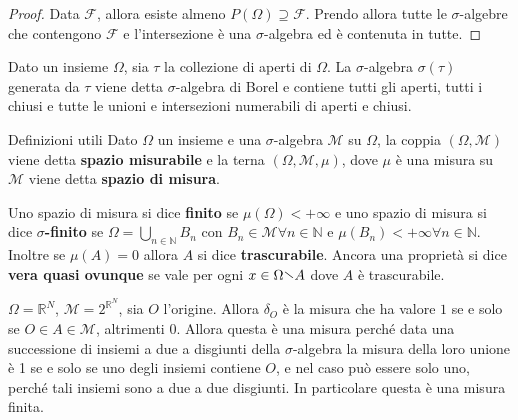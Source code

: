 \begin{proof}
    Data \(\mathcal{F}\), allora esiste almeno \(P(\Omega) \supseteq \mathcal{F}
    \). Prendo allora tutte le \(\sigma\)-algebre che contengono \(\mathcal{F}\)
    e l'intersezione è una \(\sigma\)-algebra ed è contenuta in tutte.
\end{proof}

\begin{example}
    Dato un insieme \(\Omega\), sia \(\tau\) la collezione di aperti di
    \(\Omega\). La \(\sigma\)-algebra \(\sigma(\tau)\) generata da \(\tau\)
    viene detta \(\sigma\)-algebra di Borel e contiene tutti gli aperti, tutti i
    chiusi e tutte le unioni e intersezioni numerabili di aperti e chiusi.
\end{example}

\begin{definition}[label=def:def_misura]{Definizioni utili}
    Dato \(\Omega\) un insieme e una \(\sigma\)-algebra \(\mathcal{M}\) su
    \(\Omega\), la coppia \((\Omega, \mathcal{M})\) viene detta \textbf{spazio
    misurabile} e la terna \((\Omega, \mathcal{M}, \mu)\), dove \(\mu\) è una
    misura su \(\mathcal{M}\) viene detta \textbf{spazio di misura}.

    Uno spazio di misura si dice \textbf{finito} se \(\mu(\Omega) < +\infty\) e
    uno spazio di misura si dice \textbf{\(\sigma\)-finito} se \(\Omega =
    \bigcup_{n \in \mathbb{N}} B_{n} \) con \(B_{n} \in \mathcal{M} \forall n
    \in \mathbb{N}\) e \(\mu(B_{n}) < +\infty \forall n \in \mathbb{N}\).
    Inoltre se \(\mu(A) = 0\) allora \(A\) si dice \textbf{trascurabile}. Ancora
    una proprietà si dice \textbf{vera quasi ovunque} se vale per ogni \(x \in
    \Omega \sminus A\) dove \(A\) è trascurabile.
\end{definition}

\begin{example}
    \(\Omega = \mathbb{R}^{N}\), \(\mathcal{M} = 2^{\mathbb{R}^{N}}\), sia
        \(O\) l'origine. Allora \(\delta_O\) è la misura che ha valore \(1\) se
        e solo se \(O \in A \in \mathcal{M}\), altrimenti 0. Allora questa è una
        misura perché data una successione di insiemi a due a disgiunti della
        \(\sigma\)-algebra la misura della loro unione è 1 se e solo se uno
        degli insiemi contiene \(O\), e nel caso può essere solo uno, perché
        tali insiemi sono a due a due disgiunti. In particolare questa è una
        misura finita.
\end{example}

